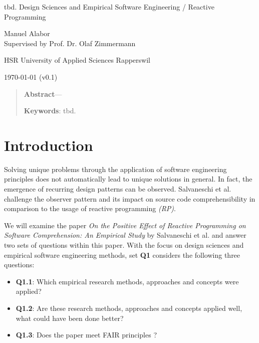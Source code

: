 \documentclass[12pt,a4paper]{article}
\newcommand{\version}{v0.1}
\begin{document}
\begin{centering}
	\Huge{tbd. Design Sciences and Empirical Software Engineering / Reactive Programming}
	\par
	\vspace{2ex}

	\normalsize{
		Manuel Alabor\\
		Supervised by Prof. Dr. Olaf Zimmermann\\
		\par
		\vspace{2ex}
		HSR University of Applied Sciences Rapperswil\\
		\par
		\vspace{2ex}
		\today{} (\version)
	}
	\par
	\vspace{2ex}

	\begin{quotation}
		\small{
			\textbf{Abstract}---
		}
		\par
		\vspace{2ex}

		\small{
			\textbf{Keywords}: tbd.
		}
		\par
		\vspace{4ex}
	\end{quotation}
\end{centering}

\section{Introduction}
Solving unique problems through the application of software engineering principles does not automatically lead to unique solutions in general. In fact, the emergence of recurring design patterns can be observed. Salvaneschi et al. \cite{7827078} challenge the observer pattern \cite{gamma1995design} and its impact on source code comprehensibility in comparison to the usage of reactive programming \emph{(RP)}.

We will examine the paper \emph{On the Positive Effect of Reactive Programming on Software Comprehension: An Empirical Study} by Salvaneschi et al. \cite{7827078} and answer two sets of questions within this paper. With the focus on  design sciences and empirical software engineering methods, set \textbf{Q1} considers the following three questions:

\begin{itemize}
	\item \textbf{Q1.1}: Which empirical research methods, approaches and concepts were applied?
	\item \textbf{Q1.2}: Are these research methods, approaches and concepts applied well, what could have been done better?
	\item \textbf{Q1.3}: Does the paper meet FAIR principles \cite{2019arXiv190805986H} \cite{wilkinson:2016}?
\end{itemize}
\end{document}
